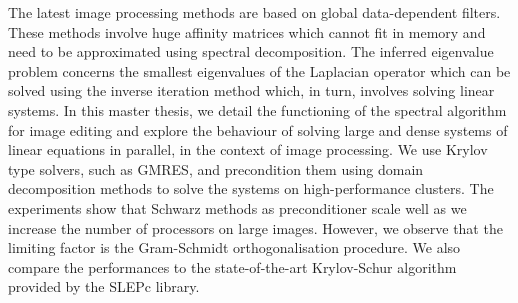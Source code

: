 The latest image processing methods are based on global data-dependent filters.
These methods involve huge affinity matrices which cannot fit in memory and need to be approximated using spectral decomposition.
The inferred eigenvalue problem concerns the smallest eigenvalues of the Laplacian operator which can be solved using the inverse iteration method which, in turn, involves solving linear systems.
In this master thesis, we detail the functioning of the spectral algorithm for image editing and explore the behaviour of solving large and dense systems of linear equations in parallel, in the context of image processing.
We use Krylov type solvers, such as GMRES, and precondition them using domain decomposition methods to solve the systems on high-performance clusters.
The experiments show that Schwarz methods as preconditioner scale well as we increase the number of processors on large images.
However, we observe that the limiting factor is the Gram-Schmidt orthogonalisation procedure.
We also compare the performances to the state-of-the-art Krylov-Schur algorithm provided by the SLEPc library.
